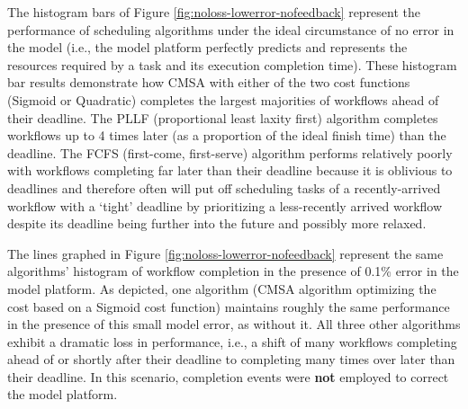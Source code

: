\documentclass[10pt]{csce}
\begin{document}
The histogram bars of Figure \ref{fig:noloss-lowerror-nofeedback} represent the
performance of scheduling algorithms under the ideal circumstance of no error
in the model (i.e., the model platform perfectly predicts and represents the
resources required by a task and its execution completion time).  These
histogram bar results demonstrate how CMSA with either of the two
cost functions (Sigmoid or Quadratic) completes the largest majorities of
workflows ahead of their deadline.  The PLLF (proportional least laxity first)
algorithm completes workflows up to 4 times later (as a proportion of the
ideal finish time) than the deadline. The FCFS (first-come, first-serve)
algorithm performs relatively poorly with workflows completing far later than
their deadline because it is oblivious to deadlines and therefore often will
put off scheduling tasks of a recently-arrived workflow with a `tight' deadline
by prioritizing a less-recently arrived workflow despite its deadline being
further into the future and possibly more relaxed.

The lines graphed in Figure \ref{fig:noloss-lowerror-nofeedback} represent the
same algorithms' histogram of workflow completion in the presence of 0.1\% error
in the model platform.  As depicted, one algorithm (CMSA algorithm optimizing
the cost based on a Sigmoid cost function) maintains roughly the same
performance in the presence of this small model error, as without it.  All three
other algorithms exhibit a dramatic loss in performance, i.e., a shift of many
workflows completing ahead of or shortly after their deadline to completing
many times over later than their deadline.  In this scenario, completion events
were \textbf{not} employed to correct the model platform.
\end{document}
